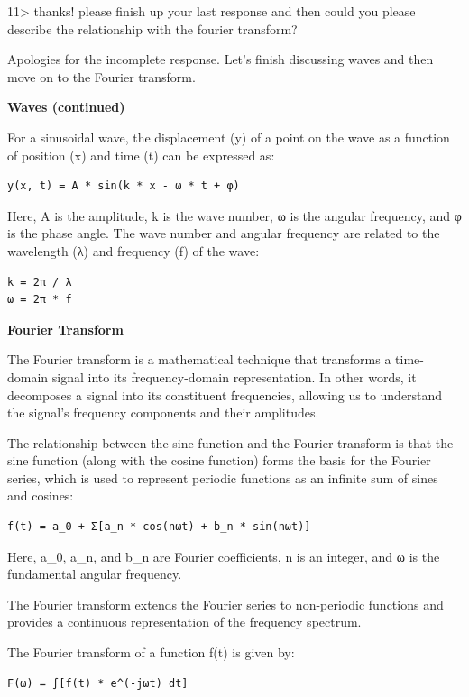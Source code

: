 \documentclass[
]{article}
\begin{document}
11\textgreater{} thanks! please finish up your last response and then
could you please describe the relationship with the fourier transform?

Apologies for the incomplete response. Let's finish discussing waves and
then move on to the Fourier transform.

\textbf{Waves (continued)}

For a sinusoidal wave, the displacement (y) of a point on the wave as a
function of position (x) and time (t) can be expressed as:

\begin{verbatim}
y(x, t) = A * sin(k * x - ω * t + φ)
\end{verbatim}

Here, A is the amplitude, k is the wave number, ω is the angular
frequency, and φ is the phase angle. The wave number and angular
frequency are related to the wavelength (λ) and frequency (f) of the
wave:

\begin{verbatim}
k = 2π / λ
ω = 2π * f
\end{verbatim}

\textbf{Fourier Transform}

The Fourier transform is a mathematical technique that transforms a
time-domain signal into its frequency-domain representation. In other
words, it decomposes a signal into its constituent frequencies, allowing
us to understand the signal's frequency components and their amplitudes.

The relationship between the sine function and the Fourier transform is
that the sine function (along with the cosine function) forms the basis
for the Fourier series, which is used to represent periodic functions as
an infinite sum of sines and cosines:

\begin{verbatim}
f(t) = a_0 + Σ[a_n * cos(nωt) + b_n * sin(nωt)]
\end{verbatim}

Here, a\_0, a\_n, and b\_n are Fourier coefficients, n is an integer,
and ω is the fundamental angular frequency.

The Fourier transform extends the Fourier series to non-periodic
functions and provides a continuous representation of the frequency
spectrum.

The Fourier transform of a function f(t) is given by:

\begin{verbatim}
F(ω) = ∫[f(t) * e^(-jωt) dt]
\end{verbatim}
\end{document}

